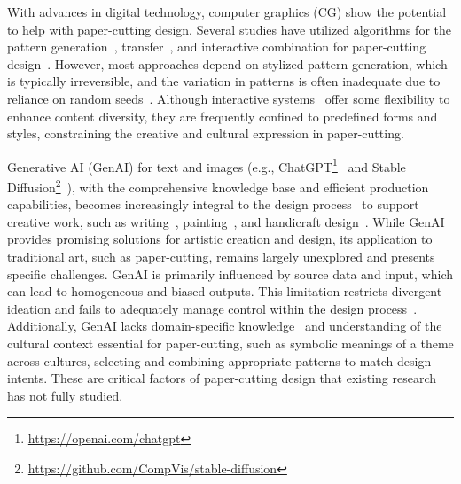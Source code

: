 With advances in digital technology, computer graphics (CG) show the potential to help with paper-cutting design. Several studies have utilized algorithms for the pattern generation~\cite{Li:2020:aug, Zhang:2006:cpc}, transfer~\cite{Liu:2009:rai, Meng:2010:apc}, and interactive combination for paper-cutting design~\cite{Liu:2018:pdf, Zhang:2005:cag}. However, most approaches depend on stylized pattern generation, which is typically irreversible, and the variation in patterns is often inadequate due to reliance on random seeds~\cite{Liu:2009:rai, Li:2020:aug, Meng:2010:apc}. Although interactive systems~\cite{Liu:2018:pdf, Hu:2017:tda, Zhang:2005:cag} offer some flexibility to enhance content diversity, they are frequently confined to predefined forms and styles, constraining the creative and cultural expression in paper-cutting.

Generative AI (GenAI) for text and images (e.g., ChatGPT\footnote{\url{https://openai.com/chatgpt}}~\cite{chatgpt} and Stable Diffusion\footnote{\url{https://github.com/CompVis/stable-diffusion}}~\cite{Rombach:2022:stablediffusion}), with the comprehensive knowledge base and efficient production capabilities, becomes increasingly integral to the design process~\cite{Heyrani:2021:creativegan, Centinic:2022:aiartreview, Muller:2022:genaichi} to support creative work, such as writing~\cite{Reza:2024:abscribe, Yuan:2022:wordcraft}, painting~\cite{Xu:2023:magicalbrush, Fan:2024:contextcam, Xu:2024:fuzzypainting}, and handicraft design~\cite{Yao:2024:shadowmaker}. 
While GenAI provides promising solutions for artistic creation and design, its application to traditional art, such as paper-cutting, remains largely unexplored and presents specific challenges. GenAI is primarily influenced by source data and input, which can lead to homogeneous and biased outputs. This limitation restricts divergent ideation and fails to adequately manage control within the design process~\cite{Brown:2020:fewshotlearners, Amderson:2024:homogenization, Hou:2024:c2ideas, Xu:2023:magicalbrush, Wang:2024:roomdreaming}. Additionally, GenAI lacks domain-specific knowledge~\cite{Hou:2024:c2ideas, Lu:2023:humanstillwin} and understanding of the cultural context essential for paper-cutting, such as symbolic meanings of a theme across cultures, selecting and combining appropriate patterns to match design intents. These are critical factors of paper-cutting design that existing research has not fully studied.

